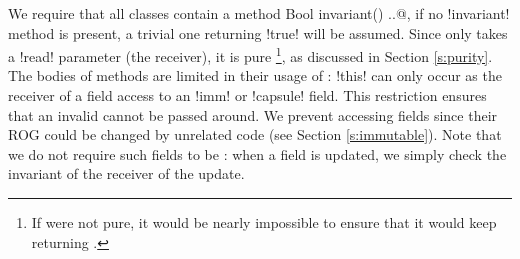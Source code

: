 



We require that all classes contain a \Q@read method Bool invariant() {..}@, if no \Q!invariant! method is present, a trivial one returning \Q!true! will be assumed. Since \Q@invariant@ only takes a \Q!read! parameter (the receiver), it is pure \footnote{If \Q@invariant@ were not pure, it would be nearly impossible to ensure that it would keep returning \Q@true@.}, as discussed in Section \ref{s:purity}.
The bodies of \Q@invariant@ methods are limited in their usage of \Q@this@: \Q!this! can only occur as the receiver of a field access to an \Q!imm! or \Q!capsule! field. This restriction ensures that 
an invalid \Q@this@ cannot be passed around.
We prevent accessing \Q@mut@ fields since their ROG could be changed by unrelated code (see Section \ref{s:immutable}).
Note that we do not require such fields to be \Q@final@: when a field is updated, we simply check the invariant of the receiver of the update.

